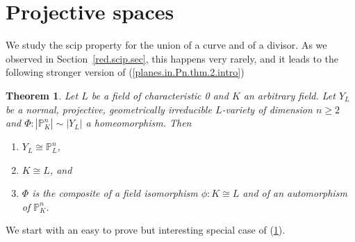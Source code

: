 \documentclass{amsart}
\newtheorem{thm}{Theorem}%
\theoremstyle{definition}
\theoremstyle{remark}
\newcommand{\p}[0]{{\mathbb P}}
\begin{document}
\section{Projective spaces}\label{proj.sp.sec}







We study the scip property for the union of a curve and of a divisor.
As we observed in Section~\ref{red.scip.sec},
this happens very rarely, and it leads to the following  stronger version of 
(\ref{planes.in.Pn.thm.2.intro})




\begin{thm}\label{planes.in.Pn.thm.2}
Let $L$ be a  field  of characteristic 0 and  $K$    an arbitrary  field.
Let $Y_L$ be a normal, projective, geometrically irreducible  $L$-variety of dimension $n\geq 2$  and 
 $\Phi:|\p^n_K|\sim |Y_L|$  a homeomorphism.  Then 
\begin{enumerate}
\item $Y_L\cong \p^n_L$,
\item $K\cong L$, and 
\item $\Phi$  
is the composite of a field isomorphism  $\phi:K\cong L$  and of an  automorphism of $\p^n_K$. 
\end{enumerate}
\end{thm}










We start with an easy to prove but interesting special case of 
(\ref{planes.in.Pn.thm.2}). 
\end{document}
